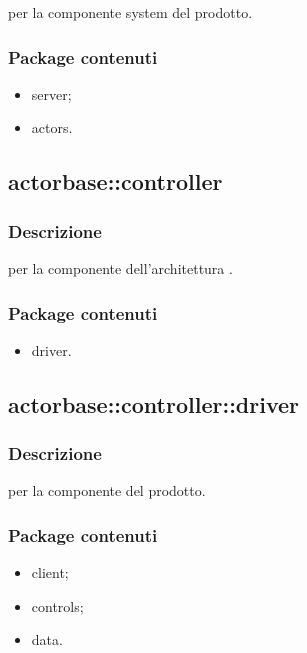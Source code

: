 \documentclass{scalatekids-article}
\begin{document}
 per la componente system del prodotto.

\subsubsection{Package contenuti}

\begin{itemize}
\item server;
\item actors.
\end{itemize}

\subsection{actorbase::controller}

\subsubsection{Descrizione}

 per la componente  dell'architettura .

\subsubsection{Package contenuti}

\begin{itemize}
\item driver.
\end{itemize}

\subsection{actorbase::controller::driver}

\subsubsection{Descrizione}

 per la componente  del prodotto.

\subsubsection{Package contenuti}

\begin{itemize}
\item client;
\item controls;
\item data.
\end{itemize}
\end{document}
